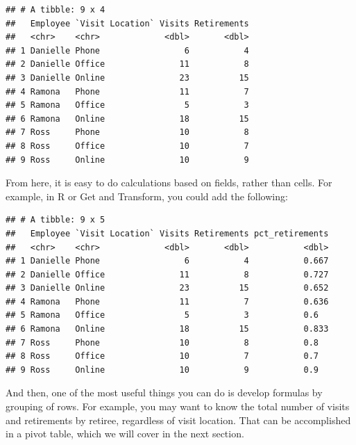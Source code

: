 \documentclass[
]{book}
\newenvironment{Shaded}{\begin{snugshade}}{\end{snugshade}}
\newcommand{\DataTypeTok}[1]{\textcolor[rgb]{0.13,0.29,0.53}{#1}}
\newcommand{\KeywordTok}[1]{\textcolor[rgb]{0.13,0.29,0.53}{\textbf{#1}}}
\newcommand{\NormalTok}[1]{#1}
\newcommand{\OperatorTok}[1]{\textcolor[rgb]{0.81,0.36,0.00}{\textbf{#1}}}
\newcommand{\StringTok}[1]{\textcolor[rgb]{0.31,0.60,0.02}{#1}}
\begin{document}
\begin{verbatim}
## # A tibble: 9 x 4
##   Employee `Visit Location` Visits Retirements
##   <chr>    <chr>             <dbl>       <dbl>
## 1 Danielle Phone                 6           4
## 2 Danielle Office               11           8
## 3 Danielle Online               23          15
## 4 Ramona   Phone                11           7
## 5 Ramona   Office                5           3
## 6 Ramona   Online               18          15
## 7 Ross     Phone                10           8
## 8 Ross     Office               10           7
## 9 Ross     Online               10           9
\end{verbatim}

From here, it is easy to do calculations based on fields, rather than cells. For example, in R or Get and Transform, you could add the following:

\begin{Shaded}
\end{Shaded}

\begin{verbatim}
## # A tibble: 9 x 5
##   Employee `Visit Location` Visits Retirements pct_retirements
##   <chr>    <chr>             <dbl>       <dbl>           <dbl>
## 1 Danielle Phone                 6           4           0.667
## 2 Danielle Office               11           8           0.727
## 3 Danielle Online               23          15           0.652
## 4 Ramona   Phone                11           7           0.636
## 5 Ramona   Office                5           3           0.6  
## 6 Ramona   Online               18          15           0.833
## 7 Ross     Phone                10           8           0.8  
## 8 Ross     Office               10           7           0.7  
## 9 Ross     Online               10           9           0.9
\end{verbatim}

And then, one of the most useful things you can do is develop formulas by grouping of rows. For example, you may want to know the total number of visits and retirements by retiree, regardless of visit location. That can be accomplished in a pivot table, which we will cover in the next section.
\end{document}
